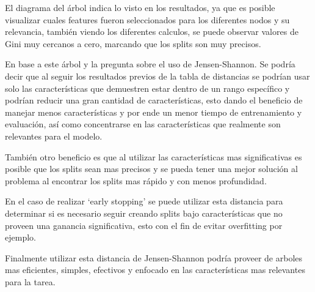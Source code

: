 \documentclass[12pt,a4paper]{article}
\begin{document}
El diagrama del árbol indica lo visto en los resultados, ya que es posible visualizar cuales features fueron
seleccionados para los diferentes nodos y su relevancia, también viendo los diferentes calculos, se puede observar
valores de Gini muy cercanos a cero, marcando que los splits son muy precisos.

En base a este árbol y la pregunta sobre el uso de Jensen-Shannon.
Se podría decir que al seguir los resultados previos de la tabla de distancias se podrían usar solo las
características que demuestren estar dentro de un rango específico y podrían reducir una gran cantidad de características,
esto dando el beneficio de manejar menos características y por ende un menor tiempo de entrenamiento y evaluación, así como
concentrarse en las características que realmente son relevantes para el modelo.

También otro beneficio es que al utilizar las características mas significativas es posible que los splits sean mas precisos
y se pueda tener una mejor solución al problema al encontrar los splits mas rápido y con menos profundidad.

En el caso de realizar `early stopping' se puede utilizar esta distancia para determinar si es necesario seguir creando splits bajo características
que no proveen una ganancia significativa, esto con el fin de evitar overfitting por ejemplo.

Finalmente utilizar esta distancia de Jensen-Shannon podría proveer de arboles mas eficientes, simples, efectivos y enfocado
en las características mas relevantes para la tarea.
\end{document}

